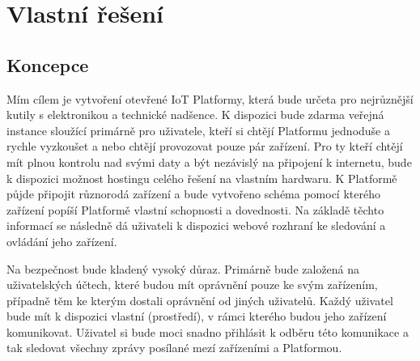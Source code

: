 \section{Vlastní řešení}

\subsection{Koncepce}
Mím cílem je vytvoření otevřené IoT Platformy, která bude určeta pro nejrůznější kutily s elektronikou a technické nadšence. K dispozici bude zdarma veřejná instance sloužící primárně pro uživatele, kteří si chtějí Platformu jednoduše a rychle vyzkoušet a nebo chtějí provozovat pouze pár zařízení. Pro ty kteří chtějí mít plnou kontrolu nad svými daty a být nezávislý na připojení k internetu, bude k dispozici možnost hostingu celého řešení na vlastním hardwaru. K Platformě půjde připojit různorodá zařízení a bude vytvořeno schéma pomocí kterého zařízení popíší Platformě vlastní schopnosti a dovednosti. Na základě těchto informací se následně dá uživateli k dispozici webové rozhraní ke sledování a ovládání jeho zařízení.

Na bezpečnost bude kladený vysoký důraz. Primárně bude založená na uživatelských účtech, které budou mít oprávnění pouze ke svým zařízením, případně těm ke kterým dostali oprávnění od jiných uživatelů. Každý uživatel bude mít k dispozici vlastní  (prostředí), v rámci kterého budou jeho zařízení komunikovat. Uživatel si bude moci snadno přihlásit k odběru této komunikace a tak sledovat všechny zprávy posílané mezí zařízeními a Platformou.



